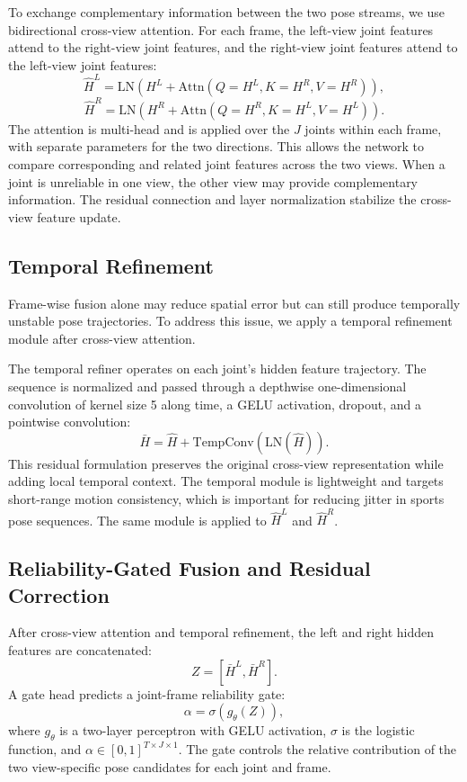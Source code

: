 \documentclass[preprint,12pt]{elsarticle}
\begin{document}
To exchange complementary information between the two pose streams, we use bidirectional cross-view attention. For each frame, the left-view joint features attend to the right-view joint features, and the right-view joint features attend to the left-view joint features:
\[
\hat{H}^{L}
=
\mathrm{LN}\!\left(H^{L}+\mathrm{Attn}(Q=H^{L}, K=H^{R}, V=H^{R})\right),
\]
\[
\hat{H}^{R}
=
\mathrm{LN}\!\left(H^{R}+\mathrm{Attn}(Q=H^{R}, K=H^{L}, V=H^{L})\right).
\]
The attention is multi-head and is applied over the \(J\) joints within each frame, with separate parameters for the two directions. This allows the network to compare corresponding and related joint features across the two views. When a joint is unreliable in one view, the other view may provide complementary information. The residual connection and layer normalization stabilize the cross-view feature update.

\subsection{Temporal Refinement}
\label{subsec:temporal_refinement}

Frame-wise fusion alone may reduce spatial error but can still produce temporally unstable pose trajectories. To address this issue, we apply a temporal refinement module after cross-view attention.

The temporal refiner operates on each joint's hidden feature trajectory. The sequence is normalized and passed through a depthwise one-dimensional convolution of kernel size 5 along time, a GELU activation, dropout, and a pointwise convolution:
\[
\bar{H} = \hat{H} + \mathrm{TempConv}(\mathrm{LN}(\hat{H})).
\]
This residual formulation preserves the original cross-view representation while adding local temporal context. The temporal module is lightweight and targets short-range motion consistency, which is important for reducing jitter in sports pose sequences. The same module is applied to \(\hat{H}^{L}\) and \(\hat{H}^{R}\).

\subsection{Reliability-Gated Fusion and Residual Correction}
\label{subsec:reliability_fusion}

After cross-view attention and temporal refinement, the left and right hidden features are concatenated:
\[
Z = [\bar{H}^{L}, \bar{H}^{R}].
\]
A gate head predicts a joint-frame reliability gate:
\[
\alpha = \sigma(g_{\theta}(Z)),
\]
where \(g_{\theta}\) is a two-layer perceptron with GELU activation, \(\sigma\) is the logistic function, and \(\alpha \in [0,1]^{T \times J \times 1}\). The gate controls the relative contribution of the two view-specific pose candidates for each joint and frame.
\end{document}
